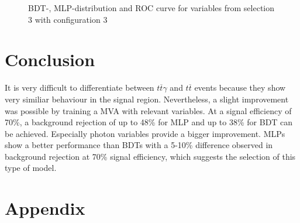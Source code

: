 \documentclass[11pt]{scrartcl}
\begin{document}
\begin{figure}[H]
	\caption{BDT-, MLP-distribution and ROC curve for variables from selection 3 with configuration 3}
	 \label{fig:ROC_s3_config3}	
	\end{figure}
				
\section{Conclusion}
It is very difficult to differentiate between $t\overline{t}\gamma$ and $t\overline{t}$ events because they show very similiar behaviour in the signal region. Nevertheless, a slight improvement was possible by training a MVA with relevant variables. At a signal efficiency of 70\%, a background rejection of up to 48\% for MLP and up to 38\% for BDT can be achieved. Especially photon variables provide a bigger improvement. MLPs show a better performance than BDTs with a 5-10\% difference observed in background rejection at 70\% signal efficiency, which suggests the selection of this type of model.

\appendix
\section{Appendix}
\end{document}
